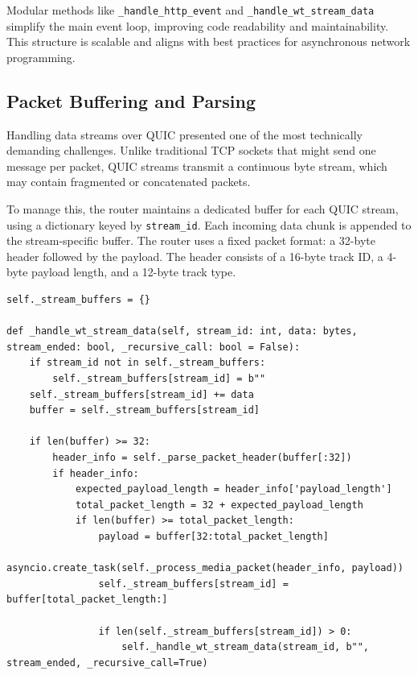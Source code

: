Modular methods like \texttt{\_handle\_http\_event} and \texttt{\_handle\_wt\_stream\_data} simplify the main event loop, improving code readability and maintainability. This structure is scalable and aligns with best practices for asynchronous network programming.

\subsection{Packet Buffering and Parsing}

Handling data streams over QUIC presented one of the most technically demanding challenges. Unlike traditional TCP sockets that might send one message per packet, QUIC streams transmit a continuous byte stream, which may contain fragmented or concatenated packets.

To manage this, the router maintains a dedicated buffer for each QUIC stream, using a dictionary keyed by \texttt{stream\_id}. Each incoming data chunk is appended to the stream-specific buffer. The router uses a fixed packet format: a 32-byte header followed by the payload. The header consists of a 16-byte track ID, a 4-byte payload length, and a 12-byte track type.

\begin{lstlisting}[breaklines=true,basicstyle=\small\ttfamily,frame=single]
self._stream_buffers = {}

def _handle_wt_stream_data(self, stream_id: int, data: bytes, stream_ended: bool, _recursive_call: bool = False):
    if stream_id not in self._stream_buffers:
        self._stream_buffers[stream_id] = b""
    self._stream_buffers[stream_id] += data
    buffer = self._stream_buffers[stream_id]

    if len(buffer) >= 32:
        header_info = self._parse_packet_header(buffer[:32])
        if header_info:
            expected_payload_length = header_info['payload_length']
            total_packet_length = 32 + expected_payload_length
            if len(buffer) >= total_packet_length:
                payload = buffer[32:total_packet_length]
                asyncio.create_task(self._process_media_packet(header_info, payload))
                self._stream_buffers[stream_id] = buffer[total_packet_length:]

                if len(self._stream_buffers[stream_id]) > 0:
                    self._handle_wt_stream_data(stream_id, b"", stream_ended, _recursive_call=True)
\end{lstlisting}

